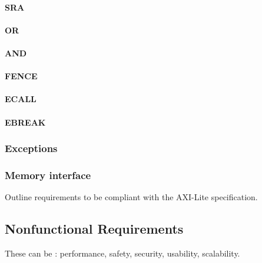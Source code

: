 \paragraph{SRA}

\paragraph{OR}

\paragraph{AND}

\paragraph{FENCE}

\paragraph{ECALL}

\paragraph{EBREAK}

\subsubsection{Exceptions}



\subsubsection{Memory interface}
\label{spec-memory-interface}

\begin{content}
  Outline requirements to be compliant with the AXI-Lite specification.
\end{content}

\subsection{Nonfunctional Requirements}

\begin{content}
These can be : performance, safety, security, usability, scalability.
\end{content}

\newpage
